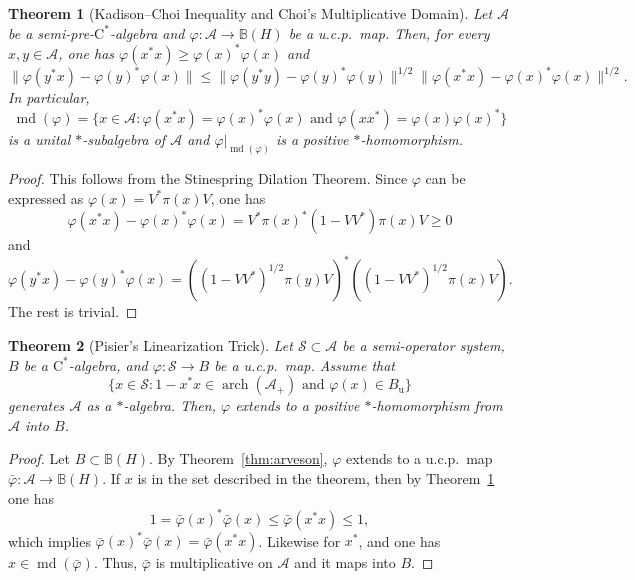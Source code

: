 \documentclass[12pt]{amsart}
\newtheorem{thm}{Theorem}
\theoremstyle{definition}
\begin{document}
\begin{thm}[Kadison--Choi Inequality and Choi's Multiplicative Domain]\label{thm:choi}
Let ${{\mathcal A}}$ be a {semi-pre-$\mathrm{C}^*$-alge\-bra\xspace} and ${\varphi}\colon{{\mathcal A}}\to{{\mathbb B}}({H})$ be a u.c.p.\ map.
Then, for every $x,y\in{{\mathcal A}}$, one has
${\varphi}(x^*x)\geq{\varphi}(x)^*{\varphi}(x)$ and
\[
\|{\varphi}(y^*x)-{\varphi}(y)^*{\varphi}(x)\|\le\|{\varphi}(y^*y)-{\varphi}(y)^*{\varphi}(y)\|^{1/2}\|{\varphi}(x^*x)-{\varphi}(x)^*{\varphi}(x)\|^{1/2}.
\]
In particular,
\[
\operatorname*{md}({\varphi})=\{ x\in{{\mathcal A}} : {\varphi}(x^*x)={\varphi}(x)^*{\varphi}(x)\mbox{ and }{\varphi}(xx^*)={\varphi}(x){\varphi}(x)^*\}
\]
is a unital $*$-subalgebra of ${{\mathcal A}}$ and ${\varphi}|_{\operatorname*{md}({\varphi})}$ is a positive {$*$-homo\-mor\-phism\xspace}.
\end{thm}
\begin{proof}
This follows from the Stinespring Dilation Theorem.
Since ${\varphi}$ can be expressed as ${\varphi}(x)=V^*\pi(x)V$, one has
\[
{\varphi}(x^*x)-{\varphi}(x)^*{\varphi}(x) = V^*\pi(x)^*(1-VV^*)\pi(x)V \geq0
\]
and
\[
{\varphi}(y^*x)-{\varphi}(y)^*{\varphi}(x)=((1-VV^*)^{1/2}\pi(y)V)^*((1-VV^*)^{1/2}\pi(x)V).
\]
The rest is trivial.
\end{proof}
\begin{thm}[Pisier's Linearization Trick]
Let ${{\mathcal S}}\subset{{\mathcal A}}$ be a semi-operator system,
$B$ be a {$\mathrm{C}^*$-alge\-bra\xspace}, and ${\varphi}\colon {{\mathcal S}}\to B$ be a u.c.p.\ map.
Assume that
\[
\{ x\in{{\mathcal S}} : 1-x^*x\in\operatorname*{arch}({{\mathcal A}}_+)\mbox{ and }{\varphi}(x)\in B_{\mathrm{u}}\}
\]
generates ${{\mathcal A}}$ as a $*$-algebra. Then, ${\varphi}$ extends to
a positive {$*$-homo\-mor\-phism\xspace} from ${{\mathcal A}}$ into $B$.
\end{thm}
\begin{proof}
Let $B\subset{{\mathbb B}}({H})$. By Theorem~\ref{thm:arveson}, ${\varphi}$ extends to a u.c.p.\
map $\bar{\varphi}\colon{{\mathcal A}}\to{{\mathbb B}}({H})$.
If $x$ is in the set described in the theorem, then by Theorem~\ref{thm:choi} one has
\[
1=\bar{\varphi}(x)^*\bar{\varphi}(x)\le\bar{\varphi}(x^*x)\le 1,
\]
which implies $\bar{\varphi}(x)^*\bar{\varphi}(x)=\bar{\varphi}(x^*x)$.
Likewise for $x^*$, and one has $x\in\operatorname*{md}(\bar{\varphi})$.
Thus, $\bar{\varphi}$ is multiplicative on ${{\mathcal A}}$ and it maps into $B$.
\end{proof}
\end{document}
